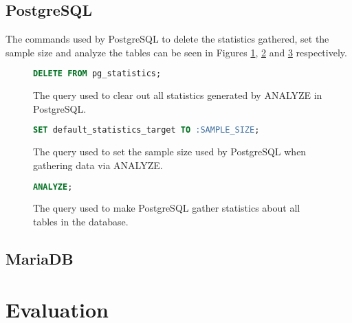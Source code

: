 \subsection{PostgreSQL}
The commands used by PostgreSQL to delete the statistics gathered, set the
sample size and analyze the tables can be
seen in Figures \ref{fig:sql:pgstatistics}, \ref{fig:sql:pgsamplesize} and
\ref{fig:sql:pganalyze} respectively.

\begin{figure}[ht]
\begin{lstlisting}[language=SQL]
  DELETE FROM pg_statistics;
\end{lstlisting}
\caption[Clearing the statistics in PostgreSQL]{The query used to clear out all
  statistics generated by ANALYZE in PostgreSQL.}
\label{fig:sql:pgstatistics}
\end{figure}

\begin{figure}[ht]
\begin{lstlisting}[language=SQL]
  SET default_statistics_target TO :SAMPLE_SIZE;
\end{lstlisting}
\caption[Setting the sample size in PostgreSQL.]{The query used to set the
  sample size used by PostgreSQL when gathering data via ANALYZE.}
\label{fig:sql:pgsamplesize}
\end{figure}

\begin{figure}[ht]
\begin{lstlisting}[language=SQL]
  ANALYZE;
\end{lstlisting}
\caption[Analyzing the tables in PostgreSQL.]{The query used to make PostgreSQL
  gather statistics about all tables in the database.}
\label{fig:sql:pganalyze}
\end{figure}
\subsection{MariaDB}

\section{Evaluation}